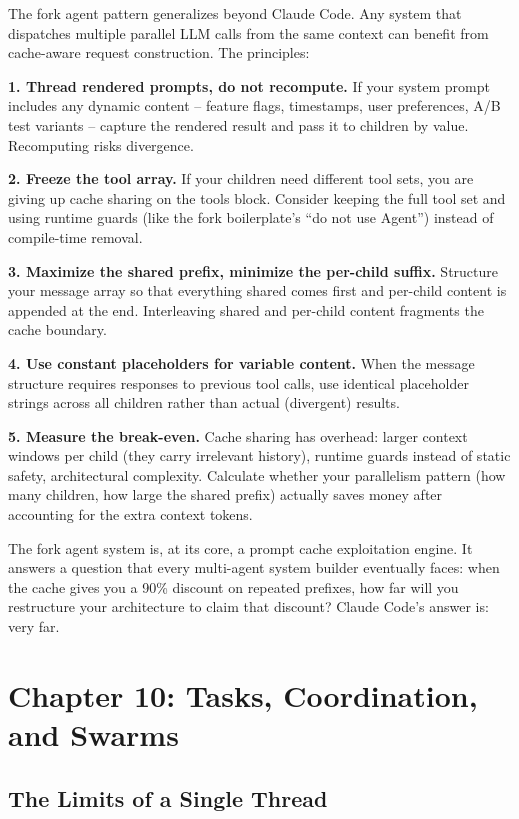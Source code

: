 \documentclass[
  english,
  11pt,
  letterpaper,
]{book}
\begin{document}
The fork agent pattern generalizes beyond Claude Code. Any system that
dispatches multiple parallel LLM calls from the same context can benefit
from cache-aware request construction. The principles:

\textbf{1. Thread rendered prompts, do not recompute.} If your system
prompt includes any dynamic content -- feature flags, timestamps, user
preferences, A/B test variants -- capture the rendered result and pass
it to children by value. Recomputing risks divergence.

\textbf{2. Freeze the tool array.} If your children need different tool
sets, you are giving up cache sharing on the tools block. Consider
keeping the full tool set and using runtime guards (like the fork
boilerplate's ``do not use Agent'') instead of compile-time removal.

\textbf{3. Maximize the shared prefix, minimize the per-child suffix.}
Structure your message array so that everything shared comes first and
per-child content is appended at the end. Interleaving shared and
per-child content fragments the cache boundary.

\textbf{4. Use constant placeholders for variable content.} When the
message structure requires responses to previous tool calls, use
identical placeholder strings across all children rather than actual
(divergent) results.

\textbf{5. Measure the break-even.} Cache sharing has overhead: larger
context windows per child (they carry irrelevant history), runtime
guards instead of static safety, architectural complexity. Calculate
whether your parallelism pattern (how many children, how large the
shared prefix) actually saves money after accounting for the extra
context tokens.

The fork agent system is, at its core, a prompt cache exploitation
engine. It answers a question that every multi-agent system builder
eventually faces: when the cache gives you a 90\% discount on repeated
prefixes, how far will you restructure your architecture to claim that
discount? Claude Code's answer is: very far.

\chapter{Chapter 10: Tasks, Coordination, and
Swarms}\label{chapter-10-tasks-coordination-and-swarms}

\section{The Limits of a Single
Thread}\label{the-limits-of-a-single-thread}
\end{document}
